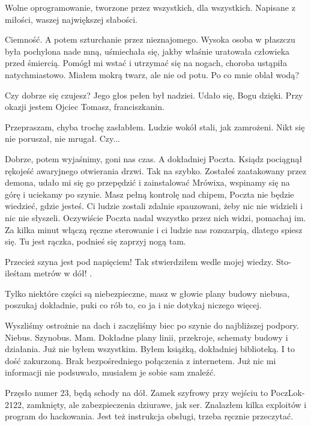 \ds{} Wolne oprogramowanie, tworzone przez wszystkich, dla wszystkich. Napisane z miłości, waszej największej słabości. \de{}

Ciemność. A potem szturchanie przez nieznajomego.
Wysoka osoba w płaszczu była pochylona nade mną, uśmiechała się, jakby właśnie uratowała człowieka przed śmiercią.
Pomógł mi wstać i utrzymać się na nogach, choroba ustąpiła natychmiastowo.
Miałem mokrą twarz, ale nie od potu. Po co mnie oblał wodą?

\ds{} Czy dobrze się czujesz? \dm{} Jego głos pełen był nadziei. \dm{} Udało się, Bogu dzięki. Przy okazji jestem Ojciec Tomasz, franciszkanin. \de{}

\ds{} Przepraszam, chyba trochę zasłabłem. \dm{} Ludzie wokół stali, jak zamrożeni. Nikt się nie poruszał, nie mrugał. \dm{}
Czy... \de{}

\ds{} Dobrze, potem wyjaśnimy, goni nas czas. A dokładniej Poczta. \dm{} Ksiądz pociągnął rękojeść awaryjnego otwierania drzwi.
\dm{} Tak na szybko. Zostałeś zaatakowany przez demona, udało mi się go przepędzić i zainstalować Mrówixa, wspinamy się na górę i uciekamy po szynie.
Masz pełną kontrolę nad chipem, Poczta nie będzie wiedzieć, gdzie jesteś.
Ci ludzie zostali zdalnie spauzowani, żeby nic nie widzieli i nic nie słyszeli. Oczywiście Poczta nadal wszystko przez nich widzi, pomachaj im.
Za kilka minut włączą ręczne sterowanie i ci ludzie nas rozszarpią, dlatego spiesz się. Tu jest rączka, podnieś się zaprzyj nogą tam.\de{}

\ds{} Przecież szyna jest pod napięciem! \dm{} Tak stwierdziłem wedle mojej wiedzy. \dm{} Sto-ileśtam metrów w dół! \de{}.

\ds{} Tylko niektóre części są niebezpieczne, masz w głowie plany budowy niebusa, poszukaj dokładnie, puki co rób to, co ja i nie dotykaj niczego więcej. \de{}

Wyszliśmy ostrożnie na dach i zaczęliśmy biec po szynie do najbliższej podpory.
Niebus. Szynobus. Mam. Dokładne plany linii, przekroje, schematy budowy i działania.
Już nie byłem wszystkim. Byłem książką, dokładniej biblioteką. I to dość zakurzoną.
Brak bezpośredniego połączenia z internetem. Już nic mi informacji nie podsuwało, musiałem je sobie sam znaleźć.

Przęsło numer 23, będą schody na dół. Zamek szyfrowy przy wejściu to PoczLok-2122, zamknięty, ale zabezpieczenia dziurawe, jak ser. 
Znalazłem kilka exploitów i program do hackowania. Jest też instrukcja obsługi, trzeba ręcznie przeczytać.

